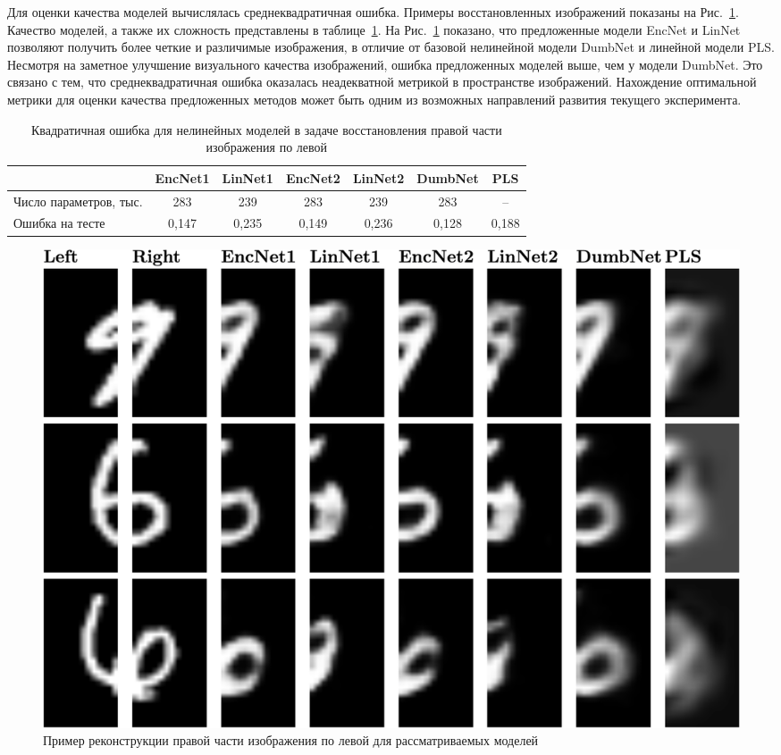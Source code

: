 Для оценки качества моделей вычислялась среднеквадратичная ошибка. Примеры восстановленных изображений показаны на Рис.~\ref{ch2:fig:mnist_nn_preds}. Качество моделей, а также их сложность представлены в таблице~\ref{ch2:tbl:mnist_nn_error}.
На Рис.~\ref{ch2:fig:mnist_nn_preds} показано, что предложенные модели EncNet и LinNet позволяют получить более четкие и различимые изображения, в отличие от базовой нелинейной модели DumbNet и линейной модели PLS.
Несмотря на заметное улучшение визуального качества изображений, ошибка предложенных моделей выше, чем у модели DumbNet.
Это связано с тем, что среднеквадратичная ошибка оказалась неадекватной метрикой в пространстве изображений.
Нахождение оптимальной метрики для оценки качества предложенных методов может быть одним из возможных направлений развития текущего эксперимента.

\begin{table}[!ht]
	\caption{Квадратичная ошибка для нелинейных моделей в задаче восстановления правой части изображения по левой}
	\centering
	\small
	\begin{tabular}{l|cccccc}
	\hline
		& EncNet1 & LinNet1 & EncNet2 & LinNet2 & DumbNet & PLS\\  \hline
		Число параметров, тыс. & 283 & 239 & 283 & 239  & 283 & --\\
		Ошибка на тесте & 0,147 & 0,235 & 0,149 & 0,236 & 0,128 & 0,188 \\
		\hline
	\end{tabular}
	\label{ch2:tbl:mnist_nn_error}
\end{table}

\begin{figure}[!ht]
	\centering 
	\includegraphics[width=\linewidth]{figs/ch2/mnist_preds}
	\caption{Пример реконструкции правой части изображения по левой для рассматриваемых моделей}
	\label{ch2:fig:mnist_nn_preds}
\end{figure}
